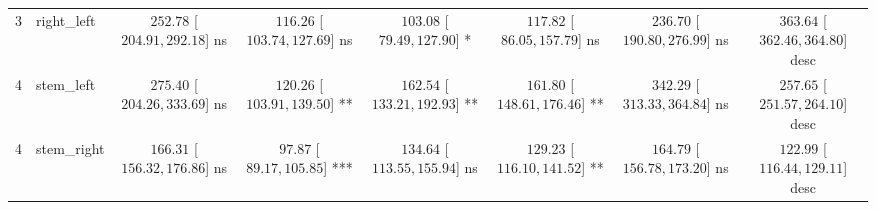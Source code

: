 \begin{table}[ht]
\begin{tabular}{llcccccc}
3 & right_left & $252.78$ [$204.91, 292.18$] ns & $116.26$ [$103.74, 127.69$] ns & $103.08$ [$79.49, 127.90$] * & $117.82$ [$86.05, 157.79$] ns & $236.70$ [$190.80, 276.99$] ns & $363.64$ [$362.46, 364.80$] desc \\
4 & stem_left & $275.40$ [$204.26, 333.69$] ns & $120.26$ [$103.91, 139.50$] ** & $162.54$ [$133.21, 192.93$] ** & $161.80$ [$148.61, 176.46$] ** & $342.29$ [$313.33, 364.84$] ns & $257.65$ [$251.57, 264.10$] desc \\
4 & stem_right & $166.31$ [$156.32, 176.86$] ns & $97.87$ [$89.17, 105.85$] *** & $134.64$ [$113.55, 155.94$] ns & $129.23$ [$116.10, 141.52$] ** & $164.79$ [$156.78, 173.20$] ns & $122.99$ [$116.44, 129.11$] desc \\
\bottomrule
\end{tabular}
\end{table}
